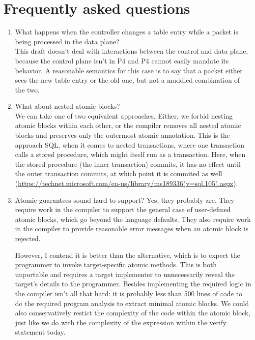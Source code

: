 \section{Frequently asked questions}
\begin{enumerate}
\item What happens when the controller changes a table entry while a packet is
being processed in the data plane? \\
This draft doesn't deal with interactions between the control and data plane,
because the control plane isn't in P4 and P4 cannot easily mandate its
behavior. A reasonable semantics for this case is to say that a packet either
sees the new table entry or the old one, but not a muddled combination of the
two.

\item What about nested atomic blocks?\\
We can take one of two equivalent approaches. Either, we forbid nesting
atomic blocks within each other, or the compiler removes all nested atomic
blocks and preserves only the outermost atomic annotation. This is the approach
SQL, when it comes to nested transactions, where one transaction calls a stored
procedure, which might itself run as a transaction. Here, when the stored
procedure (the inner transaction) commits, it has no effect until the outer
transaction commits, at which point it is commited as well
(\url{https://technet.microsoft.com/en-us/library/ms189336(v=sql.105).aspx}).

\item Atomic guarantees sound hard to support?
Yes, they probably are. They require work in the compiler to support the
general case of user-defined atomic blocks, which go beyond the language
defaults. They also require work in the compiler to provide reasonable error
messages when an atomic block is rejected.

However, I contend it is better than the alternative, which is to expect the
programmer to invoke target-specific atomic methods. This is both unportable
and requires a target implementer to unnecessarily reveal the target's details
to the programmer. Besides implementing the required logic in the compiler
isn't all that hard: it is probably less than 500 lines of code to do the
required program analysis to extract minimal atomic blocks. We could also
conservatively restict the complexity of the code within the atomic block, just
like we do with the complexity of the expression within the verify statement
today.


\end{enumerate}
